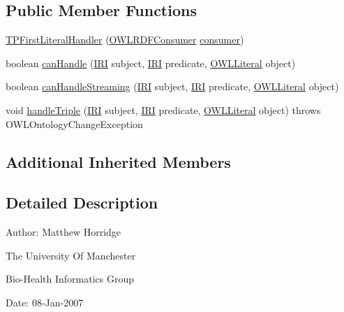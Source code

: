 \subsection*{Public Member Functions}
\begin{DoxyCompactItemize}
\item 
\hyperlink{classorg_1_1coode_1_1owlapi_1_1rdfxml_1_1parser_1_1_t_p_first_literal_handler_a9ea8f46ab8d9996038b3287d9dbd7dcc}{T\-P\-First\-Literal\-Handler} (\hyperlink{classorg_1_1coode_1_1owlapi_1_1rdfxml_1_1parser_1_1_o_w_l_r_d_f_consumer}{O\-W\-L\-R\-D\-F\-Consumer} \hyperlink{classorg_1_1coode_1_1owlapi_1_1rdfxml_1_1parser_1_1_abstract_triple_handler_a4ccf4d898ff01eb1cadfa04b23d54e9c}{consumer})
\item 
boolean \hyperlink{classorg_1_1coode_1_1owlapi_1_1rdfxml_1_1parser_1_1_t_p_first_literal_handler_a77ab8cb1bfa01f8c6ca1c6340fab612e}{can\-Handle} (\hyperlink{classorg_1_1semanticweb_1_1owlapi_1_1model_1_1_i_r_i}{I\-R\-I} subject, \hyperlink{classorg_1_1semanticweb_1_1owlapi_1_1model_1_1_i_r_i}{I\-R\-I} predicate, \hyperlink{interfaceorg_1_1semanticweb_1_1owlapi_1_1model_1_1_o_w_l_literal}{O\-W\-L\-Literal} object)
\item 
boolean \hyperlink{classorg_1_1coode_1_1owlapi_1_1rdfxml_1_1parser_1_1_t_p_first_literal_handler_abfab9374886a2bea17154ba9b2d4d070}{can\-Handle\-Streaming} (\hyperlink{classorg_1_1semanticweb_1_1owlapi_1_1model_1_1_i_r_i}{I\-R\-I} subject, \hyperlink{classorg_1_1semanticweb_1_1owlapi_1_1model_1_1_i_r_i}{I\-R\-I} predicate, \hyperlink{interfaceorg_1_1semanticweb_1_1owlapi_1_1model_1_1_o_w_l_literal}{O\-W\-L\-Literal} object)
\item 
void \hyperlink{classorg_1_1coode_1_1owlapi_1_1rdfxml_1_1parser_1_1_t_p_first_literal_handler_a0d1006e0584d521d0adfb07f2b3c09aa}{handle\-Triple} (\hyperlink{classorg_1_1semanticweb_1_1owlapi_1_1model_1_1_i_r_i}{I\-R\-I} subject, \hyperlink{classorg_1_1semanticweb_1_1owlapi_1_1model_1_1_i_r_i}{I\-R\-I} predicate, \hyperlink{interfaceorg_1_1semanticweb_1_1owlapi_1_1model_1_1_o_w_l_literal}{O\-W\-L\-Literal} object)  throws O\-W\-L\-Ontology\-Change\-Exception 
\end{DoxyCompactItemize}
\subsection*{Additional Inherited Members}


\subsection{Detailed Description}
Author\-: Matthew Horridge\par
 The University Of Manchester\par
 Bio-\/\-Health Informatics Group\par
 Date\-: 08-\/\-Jan-\/2007\par
\par
 

